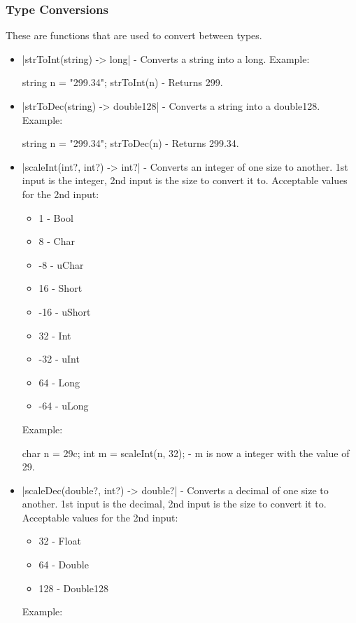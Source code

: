 \documentclass[12pt, letterpaper, oneside]{article}
\begin{document}
	\subsubsection{Type Conversions}
	These are functions that are used to convert between types.
	\begin{itemize} 
		\item[--] \spverb|strToInt(string) -> long| - Converts a string into a long. Example:
		
		
		\begin{spverbatim}
			string n = "299.34";
			strToInt(n) - Returns 299.
		\end{spverbatim}
		\item[--] \spverb|strToDec(string) -> double128| - Converts a string into a double128. Example:
		\begin{spverbatim}
			string n = "299.34";
			strToDec(n) - Returns 299.34.
		\end{spverbatim}
		\item[--] \spverb|scaleInt(int?, int?) -> int?| - Converts an integer of one size to another. 1st input is the integer, 2nd input is the size to convert it to. Acceptable values for the 2nd input:
		\begin{itemize}
			\item[--] 1 - Bool
			\item[--] 8 - Char
			\item[--] -8 - uChar
			\item[--] 16 - Short
			\item[--] -16 - uShort
			\item[--] 32 - Int
			\item[--] -32 - uInt
			\item[--] 64 - Long
			\item[--] -64 - uLong
		\end{itemize}
		Example:
		
		
		\begin{spverbatim}
			char n = 29c;
			int m = scaleInt(n, 32); - m is now a integer with the value of 29.
		\end{spverbatim}
		
		\item[--] \spverb|scaleDec(double?, int?) -> double?| - Converts a decimal of one size to another. 1st input is the decimal, 2nd input is the size to convert it to. Acceptable values for the 2nd input:
		\begin{itemize}
			\item[--] 32 - Float
			\item[--] 64 - Double
			\item[--] 128 - Double128
		\end{itemize}
		Example:
		

\end{itemize}
\end{document}
